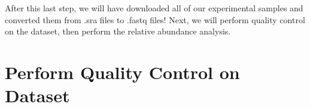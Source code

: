 After this last step, we will have downloaded all of our experimental samples and converted them from .sra files to .fastq files! Next, we will perform quality control on the dataset, then perform the relative abundance analysis.
                
    
    
    \section{Perform Quality Control on Dataset}

